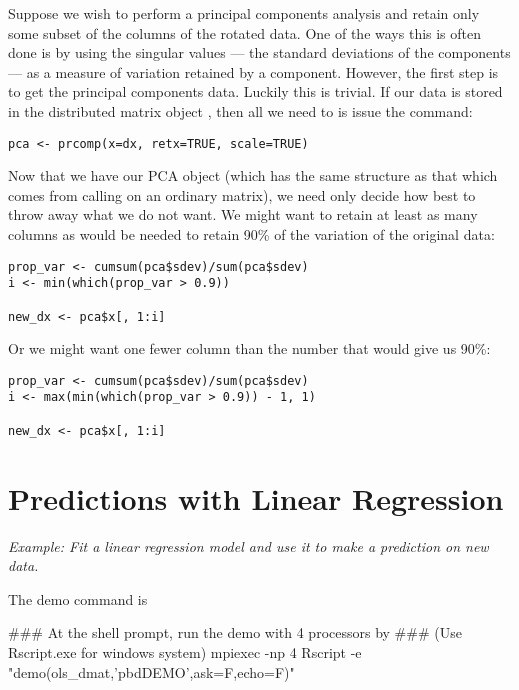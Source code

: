 Suppose we wish to perform a principal components analysis and retain only
some subset of the columns of the rotated data. One of the ways this is
often done is by using the singular values --- the standard deviations of
the components --- as a measure of variation
retained by a component. However, the first step is to get the principal
components data. Luckily this is trivial. If our data is stored in the
distributed matrix object , then all we need to is issue the
command:
\begin{lstlisting}[language=rr]
pca <- prcomp(x=dx, retx=TRUE, scale=TRUE)
\end{lstlisting}

Now that we have our PCA object (which has the same structure as that which
comes from calling 
on an ordinary  matrix), we need only decide how best to throw
away what we do not want. We might want to retain at least as many columns
as would be needed to retain 90\% of the variation of the original data:

\begin{lstlisting}[language=rr]
prop_var <- cumsum(pca$sdev)/sum(pca$sdev)
i <- min(which(prop_var > 0.9))

new_dx <- pca$x[, 1:i]
\end{lstlisting}

Or we might want one fewer column than the number that would give us 90\%:

\begin{lstlisting}[language=rr]
prop_var <- cumsum(pca$sdev)/sum(pca$sdev)
i <- max(min(which(prop_var > 0.9)) - 1, 1)

new_dx <- pca$x[, 1:i]
\end{lstlisting}








\section{Predictions with Linear Regression}
\label{sec:predictions_with_linear_regression}

\emph{Example:  Fit a linear regression model and use it to make a prediction
      on new data.}

The demo command is
\begin{Command}
### At the shell prompt, run the demo with 4 processors by
### (Use Rscript.exe for windows system)
mpiexec -np 4 Rscript -e "demo(ols_dmat,'pbdDEMO',ask=F,echo=F)"
\end{Command}

